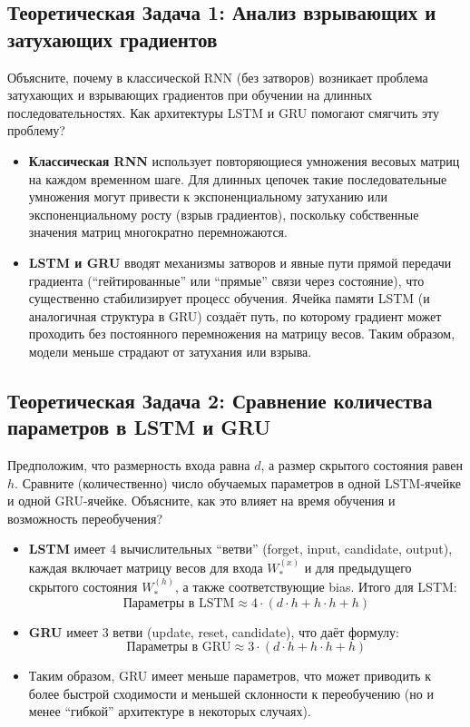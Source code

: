 \subsection{Теоретическая Задача 1: Анализ взрывающих и затухающих градиентов}
Объясните, почему в классической RNN (без затворов) возникает проблема затухающих и взрывающих градиентов при обучении на длинных последовательностях. Как архитектуры LSTM и GRU помогают смягчить эту проблему?

\begin{itemize}
    \item \textbf{Классическая RNN} использует повторяющиеся умножения весовых матриц на каждом временном шаге. Для длинных цепочек такие последовательные умножения могут привести к экспоненциальному затуханию или экспоненциальному росту (взрыв градиентов), поскольку собственные значения матриц многократно перемножаются.
    \item \textbf{LSTM и GRU} вводят механизмы затворов и явные пути прямой передачи градиента (``гейтированные'' или ``прямые'' связи через состояние), что существенно стабилизирует процесс обучения. Ячейка памяти LSTM (и аналогичная структура в GRU) создаёт путь, по которому градиент может проходить без постоянного перемножения на матрицу весов. Таким образом, модели меньше страдают от затухания или взрыва.
\end{itemize}

\subsection{Теоретическая Задача 2: Сравнение количества параметров в LSTM и GRU}
Предположим, что размерность входа равна $d$, а размер скрытого состояния равен $h$. Сравните (количественно) число обучаемых параметров в одной LSTM-ячейке и одной GRU-ячейке. Объясните, как это влияет на время обучения и возможность переобучения?

\begin{itemize}
    \item \textbf{LSTM} имеет 4 вычислительных ``ветви'' (forget, input, candidate, output), каждая включает матрицу весов для входа $W_{*}^{(x)}$ и для предыдущего скрытого состояния $W_{*}^{(h)}$, а также соответствующие bias. Итого для LSTM:
    \[
    \text{Параметры в LSTM} \approx 4 \cdot (d \cdot h + h \cdot h + h)
    \]
    \item \textbf{GRU} имеет 3 ветви (update, reset, candidate), что даёт формулу:
    \[
    \text{Параметры в GRU} \approx 3 \cdot (d \cdot h + h \cdot h + h)
    \]
    \item Таким образом, GRU имеет меньше параметров, что может приводить к более быстрой сходимости и меньшей склонности к переобучению (но и менее ``гибкой'' архитектуре в некоторых случаях).
\end{itemize}

